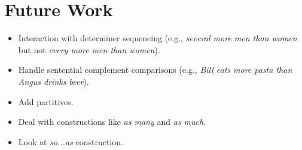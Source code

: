 \section{Future Work}

\begin{itemize}
\item Interaction with determiner sequencing (e.g., {\it several more
men than women} but not {\it *every more men than women}).

\item Handle sentential complement comparisons (e.g., {\it Bill eats
more pasta than Angus drinks beer}).

\item Add partitives.

\item Deal with constructions like {\it as many} and {\it as much}.

\item Look at {\it so...as} construction.

\end{itemize}




